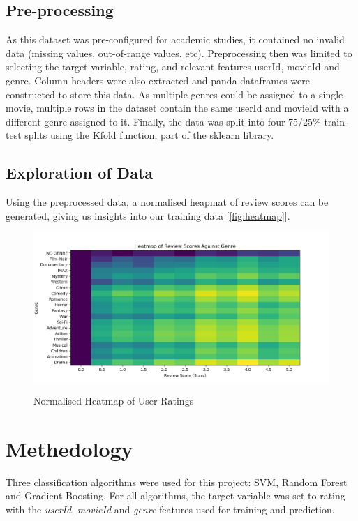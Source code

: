 \documentclass{report}
\begin{document}
	\subsection{Pre-processing}
	As this dataset was pre-configured for academic studies, it contained no invalid data (missing values, out-of-range values, etc). Preprocessing then was limited to selecting the target variable, rating, and relevant features userId, movieId and genre. Column headers were also extracted and panda dataframes were constructed to store this data. As multiple genres could be assigned to a single movie, multiple rows in the dataset contain the same userId and movieId with a different genre assigned to it. Finally, the data was split into four 75/25\% train-test splits using the Kfold function, part of the sklearn library.
	\subsection{Exploration of Data}
	Using the preprocessed data, a normalised heapmat of review scores can be generated, giving us insights into our training data [\autoref{fig:heatmap}]. 
	\begin{figure}
		\centering
		\includegraphics[width=\textwidth]{./figures/normalised_heatmap.png}
		\label{fig:heatmap}
		\caption{Normalised Heatmap of User Ratings}
	\end{figure}
	\section{Methedology}
	Three classification algorithms were used for this project: SVM, Random Forest and Gradient Boosting. For all algorithms, the target variable was set to rating with the \emph{userId}, \emph{movieId} and \emph{genre} features used for training and prediction.
\end{document}
